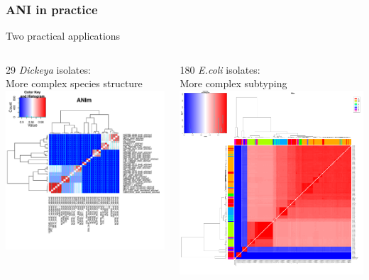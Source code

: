 \begin{frame}
  \frametitle{ANI in practice}
  Two practical applications\\[0.25cm]
  \begin{columns}[T]
    \begin{column}{6cm}
    29 \textit{Dickeya} isolates:\\
    More complex species structure\\
      \includegraphics[width=1\textwidth]{images/ANIm_Dickeya}
    \end{column}
    \begin{column}{6cm}
    180 \textit{E.coli} isolates:\\
    More complex subtyping
      \includegraphics[width=1\textwidth]{images/ANIm_Ecoli}

\end{column}
\end{columns}
\end{frame}
